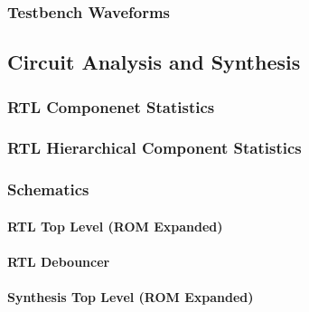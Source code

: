 \documentclass[11pt]{article}
\begin{document}
\subsubsection*{Testbench Waveforms}




\subsection*{Circuit Analysis and Synthesis}

\subsubsection*{RTL Componenet Statistics}

\subsubsection*{RTL Hierarchical Component Statistics}

\subsubsection*{Schematics}

\paragraph*{\small{RTL Top Level (ROM Expanded)}}

\paragraph*{\small{RTL Debouncer}}

\paragraph*{\small{Synthesis Top Level (ROM Expanded)}}
\end{document}
